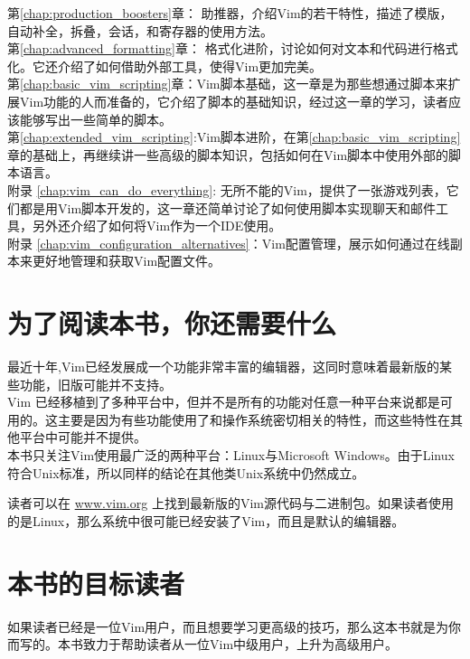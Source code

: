 第\ref{chap:production_boosters}章： 助推器，介绍Vim的若干特性，描述了模版，自动补全，拆叠，会话，和寄存器的使用方法。\\

第\ref{chap:advanced_formatting}章： 格式化进阶，讨论如何对文本和代码进行格式化。它还介绍了如何借助外部工具，使得Vim更加完美。\\

第\ref{chap:basic_vim_scripting}章：Vim脚本基础，这一章是为那些想通过脚本来扩展Vim功能的人而准备的，它介绍了脚本的基础知识，经过这一章的学习，读者应该能够写出一些简单的脚本。\\

第\ref{chap:extended_vim_scripting}:Vim脚本进阶，在第\ref{chap:basic_vim_scripting}章的基础上，再继续讲一些高级的脚本知识，包括如何在Vim脚本中使用外部的脚本语言。\\

附录 \ref{chap:vim_can_do_everything}: 无所不能的Vim，提供了一张游戏列表，它们都是用Vim脚本开发的，这一章还简单讨论了如何使用脚本实现聊天和邮件工具，另外还介绍了如何将Vim作为一个IDE使用。\\

附录 \ref{chap:vim_configuration_alternatives}：Vim配置管理，展示如何通过在线副本来更好地管理和获取Vim配置文件。\\

\section*{为了阅读本书，你还需要什么}
最近十年,Vim已经发展成一个功能非常丰富的编辑器，这同时意味着最新版的某些功能，旧版可能并不支持。\\

Vim 已经移植到了多种平台中，但并不是所有的功能对任意一种平台来说都是可用的。这主要是因为有些功能使用了和操作系统密切相关的特性，而这些特性在其他平台中可能并不提供。\\

本书只关注Vim使用最广泛的两种平台：Linux与Microsoft Windows。由于Linux符合Unix标准，所以同样的结论在其他类Unix系统中仍然成立。\\

\begin{warning}
读者可以在 \url{www.vim.org} 上找到最新版的Vim源代码与二进制包。如果读者使用的是Linux，那么系统中很可能已经安装了Vim，而且是默认的编辑器。\\
\end{warning}

\section*{本书的目标读者}
\label{sec:who_this_book_is_for}
如果读者已经是一位Vim用户，而且想要学习更高级的技巧，那么这本书就是为你而写的。本书致力于帮助读者从一位Vim中级用户，上升为高级用户。\\

